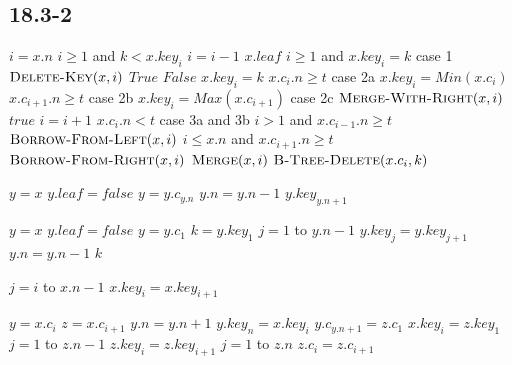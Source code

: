 \documentclass{book}
\begin{document}
\begin{CJK}{UTF8}{gkai}
\subsection*{18.3-2}

\begin{codebox}
\li $i = x.n$
\li \While $i \ge 1$ and $k < x.key_i$
\li \Do $i = i -1$
\End
\li \If $x.leaf$
\li \Then \If $i \ge 1$ and $x.key_i = k$
\li \Then \Comment case 1
\li $\textnormal{\scshape Delete-Key}(x, i)$
\li \Return $True$
\li \Else
\li \Return $False$
\End
\End
\li \If $x.key_i = k$
\li \Then \If $x.c_i.n \ge t$
\li \Then \Comment case 2a
\li $x.key_i = Min(x.c_i)$
\li \ElseIf $x.c_{i+1}.n \ge t$
\li \Then \Comment case 2b
\li $x.key_i = Max(x.c_{i+1})$
\li \Else \Comment case 2c
\li $\textnormal{\scshape Merge-With-Right}(x,i)$
\End
\li \Return $true$
\End
\li $i = i + 1$
\li \If $x.c_{i}.n < t$
\li \Then \Comment case 3a and 3b
\li \If $i > 1$ and $x.c_{i-1}.n \ge t$
\li \Then $\textnormal{\scshape Borrow-From-Left}(x, i)$
\li \ElseIf $i \le x.n$ and $x.c_{i+1}.n \ge t$
\li \Then $\textnormal{\scshape Borrow-From-Right}(x, i)$
\li \Else $\textnormal{\scshape Merge}(x, i)$
\End
\End
\li $\textnormal{\scshape B-Tree-Delete}(x.c_i, k)$
\End
\end{codebox}

\begin{codebox}
\li $y = x$
\li \While $y.leaf = false$
\li \Do $y = y.c_{y.n}$
\End
\li $y.n = y.n - 1$
\li \Return $y.key_{y.n+1}$
\end{codebox}

\begin{codebox}
\li $y = x$
\li \While $y.leaf = false$
\li \Do $y = y.c_1$
\End
\li $k = y.key_1$
\li \For $j = 1$ to $y.n-1$
\li \Do $y.key_j = y.key_{j+1}$
\End
\li $y.n = y.n - 1$
\li \Return $k$
\end{codebox}

\begin{codebox}
\li \For $j = i$ to $x.n-1$
\li \Do $x.key_i = x.key_{i+1}$
\End
\end{codebox}

\begin{codebox}
\li $y = x.c_i$
\li $z = x.c_{i+1}$
\li $y.n = y.n + 1$
\li $y.key_n = x.key_i$
\li $y.c_{y.n+1} = z.c_1$
\li $x.key_i = z.key_1$
\li \For $j = 1$ to $z.n - 1$
\li \Do $z.key_i = z.key_{i+1}$
\End
\li \For $j = 1$ to $z.n$
\li \Do $z.c_i = z.c_{i+1}$
\End
\end{codebox}


\end{CJK}
\end{document}
